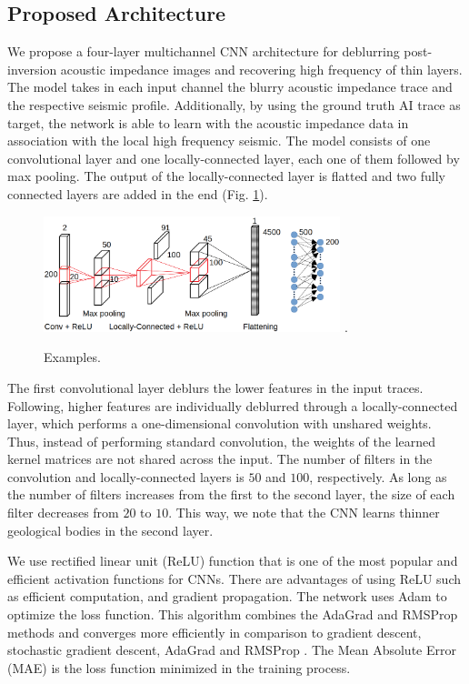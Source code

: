 \documentclass[journal]{IEEEtran}
\begin{document}
\subsection{Proposed Architecture}
We propose a four-layer multichannel CNN architecture for deblurring
post-inversion acoustic impedance images and recovering high
frequency of thin layers. The model takes in each input channel the
blurry acoustic impedance trace and the respective seismic
profile. Additionally, by using the ground truth AI trace as
target, the network is able to learn with the acoustic
impedance data in association with the local high frequency seismic.
The model consists of one convolutional layer and one locally-connected
layer, each one of them followed by max pooling. The output of the
locally-connected layer is flatted and two fully connected layers are
added in the end (Fig. \ref{fig_model}).
\begin{figure}[!t]
\centering
\includegraphics[width=3.4in]{Figs/model}
\DeclareGraphicsExtensions.
\caption{Examples.}
\label{fig_model}
\end{figure}

The first convolutional layer deblurs the lower features in
the input traces. Following, higher features are individually
deblurred through a locally-connected layer, %
which performs a one-dimensional convolution
with unshared weights. Thus, instead of performing standard
convolution, the weights of the learned kernel matrices are not
shared across the input. The number of filters in the convolution
and locally-connected layers is $50$ and $100$, respectively.
As long as the number of filters increases from the first to the
second layer, the size of each filter decreases from $20$ to $10$.
This way, we note that the CNN learns thinner geological
bodies in the second layer.

We use rectified linear unit (ReLU) function that is one
of the most popular and efficient activation functions for
CNNs. There are advantages of using ReLU such as efficient
computation, and gradient propagation. The network uses
Adam to optimize the loss function. This algorithm
combines the AdaGrad and RMSProp methods and converges more efficiently in
comparison to gradient descent, stochastic gradient descent, AdaGrad
and RMSProp \cite{Kingma2014}. The Mean Absolute Error (MAE) is the
loss function minimized in the training process.
\end{document}
